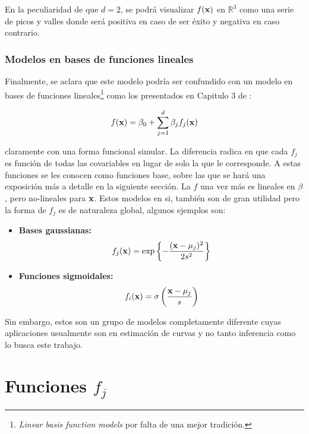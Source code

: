 \documentclass[../Main/Main.tex]{subfiles}
\begin{document}
En la peculiaridad de que $d = 2$, se podrá visualizar $f(\mathbf{x})$ en $\mathbb{R}^3$ como una serie de picos y valles donde será positiva en caso de ser éxito y negativa en caso contrario.\\

\subsubsection*{Modelos en bases de funciones lineales}

Finalmente, se aclara que este modelo podría ser confundido con un modelo en bases de funciones lineales\footnote{\textit{Linear basis function models} por falta de una mejor tradición.} como los presentados en Capitulo 3 de \autocite{bishop2006pattern}:

\begin{align} 
	f(\mathbf{x}) = \beta_0 + \sum_{j = 1}^d\beta_j f_j(\mathbf{x}) \label{ec:ExpansionBases1}
\end{align}

claramente con una forma funcional simular. La diferencia radica en que cada $f_j$ es función de todas las covariables en lugar de solo la que le corresponde. A estas funciones se les conocen como funciones base, sobre las que se hará una exposición más a detalle en la siguiente sección. La $f$ una vez más es lineales en $\beta$, pero no-lineales para $\mathbf{x}$. Estos modelos en si, también son de gran utilidad pero la forma de $f_j$ es de naturaleza global, algunos ejemplos son:

\begin{itemize}
	\item \textbf{Bases gaussianas:}
	 $$f_j(\mathbf{x}) = 
	 \exp\left\{-\dfrac{(\mathbf{x} - \mu_j)^2}{2s^2}\right\}$$
	\item \textbf{Funciones sigmoidales:} 
	$$f_i(\mathbf{x}) = 
	\sigma\left( \dfrac{\mathbf{x} - \mu_j}{s} \right)$$
\end{itemize}

Sin embargo, estos son un grupo de modelos completamente diferente cuyas aplicaciones usualmente son en estimación de curvas y no tanto inferencia como lo busca este trabajo.

\section{Funciones $f_j$} \label{sec:fj}
\end{document}
